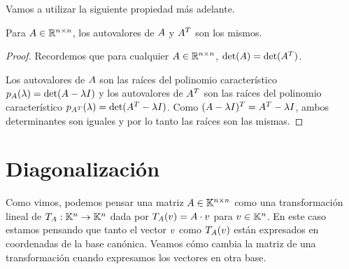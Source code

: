 Vamos a utilizar la siguiente propiedad más adelante.

\begin{prop}
Para $\Ab \in \Rnn$, los autovalores de $\Ab$ y $\Ab^T$ son los mismos.
\end{prop}

\begin{proof}
Recordemos que para cualquier $\Ab \in \Rnn$, $\det(\Ab) = \det(\Ab^T)$.

Los autovalores de $\Ab$ son las raíces del polinomio característico $p_{\Ab}(\lambda) = \det(\Ab - \lambda \Ib)$ y los autovalores de $\Ab^T$ son las raíces del polinomio característico $p_{\Ab^T}(\lambda) = \det(\Ab^T - \lambda \Ib)$. Como $(\Ab - \lambda \Ib)^T = \Ab^T - \lambda \Ib$, ambos determinantes son iguales y por lo tanto las raíces son las mismas.
\end{proof}



\section{Diagonalización}

Como vimos, podemos pensar una matriz $\Ab \in \K^{n \times n}$ como una
transformación lineal de $T_{\Ab}: \K^n \rightarrow \K^n$ dada por
$T_{\Ab}(\vb) = \Ab \cdot \vb$ para $\vb \in \K^n$. En este caso estamos pensando
que tanto el vector $\vb$ como $T_{\Ab}(\vb)$ están expresados en coordenadas de
la base canónica. Veamos cómo cambia la matriz de una transformación cuando expresamos los vectores en otra base.

